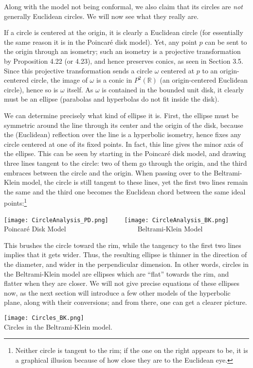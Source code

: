 \documentclass[leqno]{book}
\begin{document}
\noindent Along with the model not being conformal, we also claim that its circles are \emph{not} generally Euclidean circles.  We will now see what they really are.

If a circle is centered at the origin, it is clearly a Euclidean circle (for essentially the same reason it is in the Poincar\'e disk model).  Yet, any point $p$ can be sent to the origin through an isometry; such an isometry is a projective transformation by Proposition 4.22 (or 4.23), and hence preserves conics, as seen in Section 3.5.  Since this projective transformation sends a circle $\omega$ centered at $p$ to an origin-centered circle, the image of $\omega$ is a conic in $P^2(\mathbb R)$ (an origin-centered Euclidean circle), hence so is $\omega$ itself.  As $\omega$ is contained in the bounded unit disk, it clearly must be an ellipse (parabolas and hyperbolas do not fit inside the disk).

We can determine precisely what kind of ellipse it is.  First, the ellipse must be symmetric around the line through its center and the origin of the disk, because the (Euclidean) reflection over the line is a hyperbolic isometry, hence fixes any circle centered at one of its fixed points.  In fact, this line gives the minor axis of the ellipse.  This can be seen by starting in the Poincar\'e disk model, and drawing three lines tangent to the circle: two of them go through the origin, and the third embraces between the circle and the origin.  When passing over to the Beltrami-Klein model, the circle is still tangent to these lines, yet the first two lines remain the same and the third one becomes the Euclidean chord between the same ideal points:\footnote{Neither circle is tangent to the rim; if the one on the right appears to be, it is a graphical illusion because of how close they are to the Euclidean eye.}
\begin{center}
\texttt{[image: CircleAnalysis\_PD.png]}~~~~
\texttt{[image: CircleAnalysis\_BK.png]}\\
Poincar\'e Disk Model~~~~~~~~~~~~~~~~~~~~~Beltrami-Klein Model
\end{center}
This brushes the circle toward the rim, while the tangency to the first two lines implies that it gets wider.  Thus, the resulting ellipse is thinner in the direction of the diameter, and wider in the perpendicular dimension.  In other words, circles in the Beltrami-Klein model are ellipses which are ``flat'' towards the rim, and flatter when they are closer.  We will not give precise equations of these ellipses now, as the next section will introduce a few other models of the hyperbolic plane, along with their conversions; and from there, one can get a clearer picture.
\begin{center}
\texttt{[image: Circles\_BK.png]}\\Circles in the Beltrami-Klein model.
\end{center}
\end{document}
